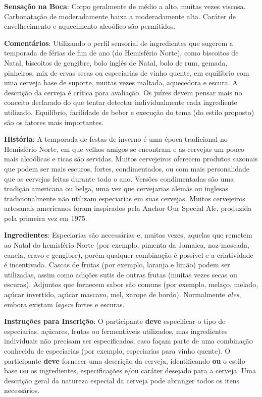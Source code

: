 \textbf{Sensação na Boca}: Corpo geralmente de médio a alto, muitas vezes viscosa. Carbonatação de moderadamente baixa a moderadamente alta. Caráter de envelhecimento e aquecimento alcoólico são permitidos.

\textbf{Comentários}: Utilizando o perfil sensorial de ingredientes que sugerem a temporada de férias de fim de ano (do Hemisfério Norte), como biscoitos de Natal, biscoitos de gengibre, bolo inglês de Natal, bolo de rum, gemada, pinheiros, mix de ervas secas ou especiarias de vinho quente, em equilíbrio com uma cerveja base de suporte, muitas vezes maltada, aquecedora e escura. A descrição da cerveja é crítica para avaliação. Os juízes devem pensar mais no conceito declarado do que tentar detectar individualmente cada ingrediente utilizado. Equilíbrio, facilidade de beber e execução do tema (do estilo proposto) são os fatores mais importantes.

\textbf{História}: A temporada de festas de inverno é uma época tradicional no Hemisfério Norte, em que velhos amigos se encontram e as cervejas um pouco mais alcoólicas e ricas são servidas. Muitos cervejeiros oferecem produtos sazonais que podem ser mais escuros, fortes, condimentados, ou com mais personalidade que as cervejas feitas durante todo o ano. Versões condimentadas são uma tradição americana ou belga, uma vez que cervejarias alemãs ou inglesas tradicionalmente não utilizam especiarias em suas cervejas. Muitos cervejeiros artesanais americanos foram inspirados pela Anchor Our Special Ale, produzida pela primeira vez em 1975.

\textbf{Ingredientes}: Especiarias são necessárias e, muitas vezes, aquelas que remetem ao Natal do hemisfério Norte (por exemplo, pimenta da Jamaica, noz-moscada, canela, cravo e gengibre), porém qualquer combinação é possível e a criatividade é incentivada. Cascas de frutas (por exemplo, laranja e limão) podem ser utilizadas, assim como adições sutis de outras frutas (muitas vezes secas ou escuras). Adjuntos que fornecem sabor são comuns (por exemplo, melaço, melado, açúcar invertido, açúcar mascavo, mel, xarope de bordo). Normalmente \textit{ales}, embora existam \textit{lagers} fortes e escuras.

\textbf{Instruções para Inscrição}: O participante \textbf{deve} especificar o tipo de especiarias, açúcares, frutas ou fermentáveis utilizados, mas ingredientes individuais não precisam ser especificados, caso façam parte de uma combinação conhecida de especiarias (por exemplo, especiarias para vinho quente). O participante \textbf{deve} fornecer uma descrição da cerveja, identificando \textbf{ou} o estilo base \textbf{ou} os ingredientes, especificações e/ou caráter desejado para a cerveja. Uma descrição geral da natureza especial da cerveja pode abranger todos os itens necessários.

